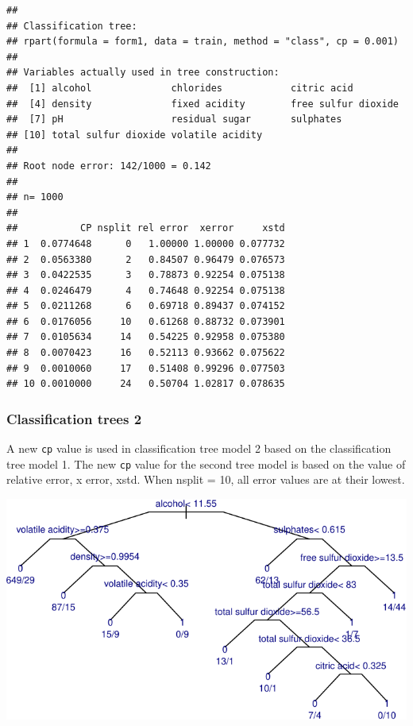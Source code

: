 \documentclass[
  english,
  man]{apa6}
\begin{document}
\begin{verbatim}
## 
## Classification tree:
## rpart(formula = form1, data = train, method = "class", cp = 0.001)
## 
## Variables actually used in tree construction:
##  [1] alcohol              chlorides            citric acid         
##  [4] density              fixed acidity        free sulfur dioxide 
##  [7] pH                   residual sugar       sulphates           
## [10] total sulfur dioxide volatile acidity    
## 
## Root node error: 142/1000 = 0.142
## 
## n= 1000 
## 
##           CP nsplit rel error  xerror     xstd
## 1  0.0774648      0   1.00000 1.00000 0.077732
## 2  0.0563380      2   0.84507 0.96479 0.076573
## 3  0.0422535      3   0.78873 0.92254 0.075138
## 4  0.0246479      4   0.74648 0.92254 0.075138
## 5  0.0211268      6   0.69718 0.89437 0.074152
## 6  0.0176056     10   0.61268 0.88732 0.073901
## 7  0.0105634     14   0.54225 0.92958 0.075380
## 8  0.0070423     16   0.52113 0.93662 0.075622
## 9  0.0010060     17   0.51408 0.99296 0.077503
## 10 0.0010000     24   0.50704 1.02817 0.078635
\end{verbatim}

\hypertarget{classification-trees-2}{%
\subsubsection{Classification trees 2}\label{classification-trees-2}}

A new \texttt{cp} value is used in classification tree model 2 based on the classification tree model 1. The new \texttt{cp} value for the second tree model is based on the value of relative error, x error, xstd. When nsplit = 10, all error values are at their lowest.

\includegraphics{report_files/figure-latex/unnamed-chunk-7-1.pdf}
\end{document}
